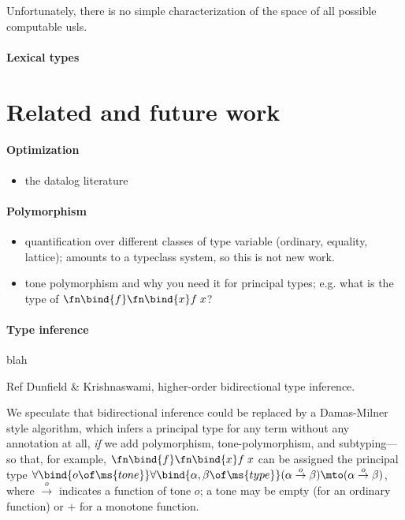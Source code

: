 \documentclass[preprint]{sigplanconf}
\begin{document}
Unfortunately, there is no simple characterization of the space of all possible
computable usls.

\paragraph{Lexical types}


\section{Related and future work}
\label{sec:futurework}

\paragraph{Optimization}
\begin{itemize}
\item \TODO the datalog literature
\end{itemize}

\paragraph{Polymorphism}
\begin{itemize}
\item \TODO quantification over different classes of type variable (ordinary,
  equality, lattice); amounts to a typeclass system, so this is not new work.
\item \TODO tone polymorphism and why you need it for principal types; e.g.
  what is the type of $\fn\bind{f}\fn\bind{x} f\;x$?
\end{itemize}

\paragraph{Type inference} blah

\TODO Ref Dunfield \& Krishnaswami, higher-order bidirectional type inference.

 We speculate that bidirectional inference could be replaced by a
Damas-Milner  style algorithm, which infers a principal type for any
term without any annotation at all, \emph{if} we add polymorphism,
tone-polymorphism, and subtyping---so that, for example, $\fn\bind{f}\fn\bind{x}
f\;x$ can be assigned the principal type
$\forall\bind{o\of\ms{tone}}\forall\bind{\alpha,\beta \of \ms{type}} (\alpha
\overset{o}\to \beta) \mto (\alpha \overset{o}\to \beta)$, where
$\overset{o}\to$ indicates a function of tone $o$; a tone may be empty (for an
ordinary function) or ${+}$ for a monotone function.
\end{document}
